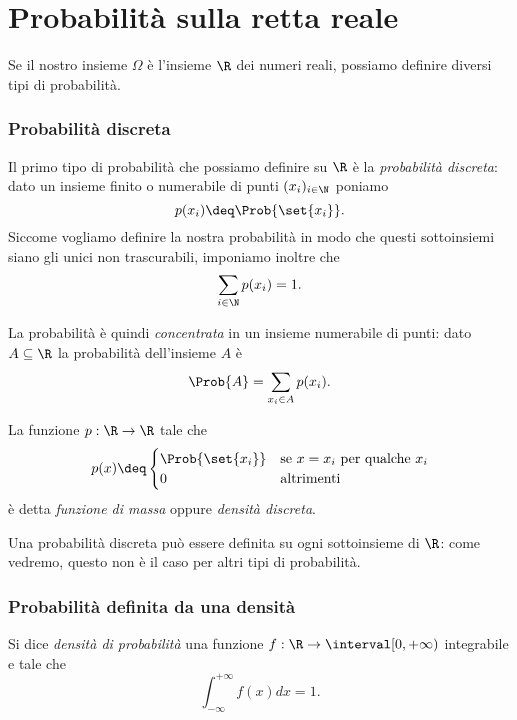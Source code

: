 \section{Probabilità sulla retta reale}

Se il nostro insieme $\Omega$ è l'insieme $\R$ dei numeri reali, possiamo definire diversi tipi di probabilità.

\subsubsection{Probabilità discreta}
Il primo tipo di probabilità che possiamo definire su $\R$ è la \emph{probabilità discreta}: dato un insieme finito o numerabile di punti $(x_i)_{i \in \N}$ poniamo \[
    p(x_i) \deq \Prob{\set{x_i}}.    
\] Siccome vogliamo definire la nostra probabilità in modo che questi sottoinsiemi siano gli unici non trascurabili, imponiamo inoltre che \[
    \sum_{i \in \N} p(x_i) = 1.    
\] 

La probabilità è quindi \emph{concentrata} in un insieme numerabile di punti: dato $A \subseteq \R$ la probabilità dell'insieme $A$ è \[
    \Prob{A} = \sum_{x_i \in A} p(x_i).    
\]

\begin{definition}
    La funzione $p : \R \to \R$ tale che \[
        p(x) \deq \begin{cases}
            \Prob{\set{x_i}} &\text{se } x = x_i \text{ per qualche } x_i\\
            0 &\text{altrimenti}
        \end{cases}    
    \]  è detta \emph{funzione di massa} oppure \emph{densità discreta}.
\end{definition}

\begin{remark}
    Una probabilità discreta può essere definita su ogni sottoinsieme di $\R$: come vedremo, questo non è il caso per altri tipi di probabilità.
\end{remark}

\subsubsection{Probabilità definita da una densità}

\begin{definition}
    Si dice \emph{densità di probabilità} una funzione $f : \R \to \interval[{0, +\infty})$ integrabile e tale che \[
        \int_{-\infty}^{+\infty} f(x)dx = 1.    
    \]
\end{definition}

